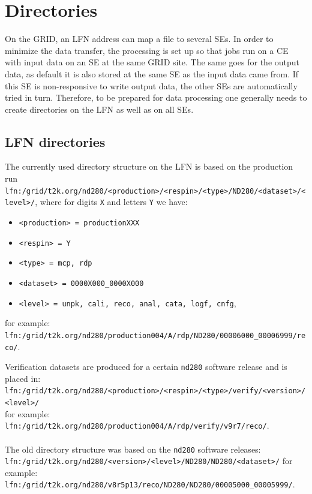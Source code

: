 \documentclass[11pt]{article}
\begin{document}
\clearpage
\section{Directories}
\label{sec:dirs}

On the GRID, an LFN address can map a file to several SEs. In order to
minimize the data transfer, the processing is set up so that jobs run
on a CE with input data on an SE at the same GRID site. The same goes
for the output data, as default it is also stored at the same SE as
the input data came from. If this SE is non-responsive to write output
data, the other SEs are automatically tried in turn. Therefore, to be
prepared for data processing one generally needs to create directories
on the LFN as well as on all SEs. 

\subsection{LFN directories}

The currently used directory structure on the LFN is based on the
production run\\
\verb+lfn:/grid/t2k.org/nd280/<production>/<respin>/<type>/ND280/<dataset>/<level>/+,
where for digits \verb+X+ and letters \verb+Y+ we have:
\begin{itemize}
\item \verb+<production> = productionXXX+
\item \verb+<respin> = Y+
\item \verb+<type> = mcp, rdp+
\item \verb+<dataset> = 0000X000_0000X000+
\item \verb+<level> = unpk, cali, reco, anal, cata, logf, cnfg+,
\end{itemize}

for example:\\ \verb+lfn:/grid/t2k.org/nd280/production004/A/rdp/ND280/00006000_00006999/reco/+.

Verification datasets are produced for a certain \verb+nd280+ software release and is placed in:\\
\verb+lfn:/grid/t2k.org/nd280/<production>/<respin>/<type>/verify/<version>/<level>/+\\
for example:\\
\verb+lfn:/grid/t2k.org/nd280/production004/A/rdp/verify/v9r7/reco/+.\\
\\
The old directory structure was based on the \verb+nd280+ software releases:\\
\verb+lfn:/grid/t2k.org/nd280/<version>/<level>/ND280/ND280/<dataset>/+
for example:\\
\verb+lfn:/grid/t2k.org/nd280/v8r5p13/reco/ND280/ND280/00005000_00005999/+.
\end{document}
